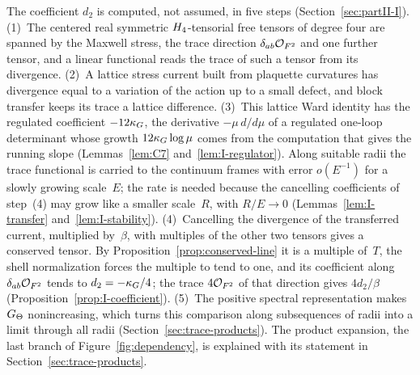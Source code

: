 The coefficient $d_2$ is computed, not assumed, in five steps (Section~\ref{sec:partII-I}). (1)~The centered real symmetric $H_4$-tensorial free tensors of degree four are spanned by the Maxwell stress, the trace direction $\delta_{ab}\mathcal{O}_{F^2}$ and one further tensor, and a linear functional reads the trace of such a tensor from its divergence. (2)~A lattice stress current built from plaquette curvatures has divergence equal to a variation of the action up to a small defect, and block transfer keeps its trace a lattice difference. (3)~This lattice Ward identity has the regulated coefficient $-12\kappa_G$, the derivative $-\mu\,d/d\mu$ of a regulated one-loop determinant whose growth $12\kappa_G\log\mu$ comes from the computation that gives the running slope (Lemmas~\ref{lem:C7} and~\ref{lem:I-regulator}). Along suitable radii the trace functional is carried to the continuum frames with error $o(E^{-1})$ for a slowly growing scale~$E$; the rate is needed because the cancelling coefficients of step~(4) may grow like a smaller scale~$R$, with $R/E\to0$ (Lemmas~\ref{lem:I-transfer} and~\ref{lem:I-stability}). (4)~Cancelling the divergence of the transferred current, multiplied by~$\beta$, with multiples of the other two tensors gives a conserved tensor. By Proposition~\ref{prop:conserved-line} it is a multiple of~$T$, the shell normalization forces the multiple to tend to one, and its coefficient along $\delta_{ab}\mathcal{O}_{F^2}$ tends to $d_2=-\kappa_G/4$; the trace $4\mathcal{O}_{F^2}$ of that direction gives $4d_2/\beta$ (Proposition~\ref{prop:I-coefficient}). (5)~The positive spectral representation makes $G_{\Theta}$ nonincreasing, which turns this comparison along subsequences of radii into a limit through all radii (Section~\ref{sec:trace-products}). The product expansion, the last branch of Figure~\ref{fig:dependency}, is explained with its statement in Section~\ref{sec:trace-products}.
